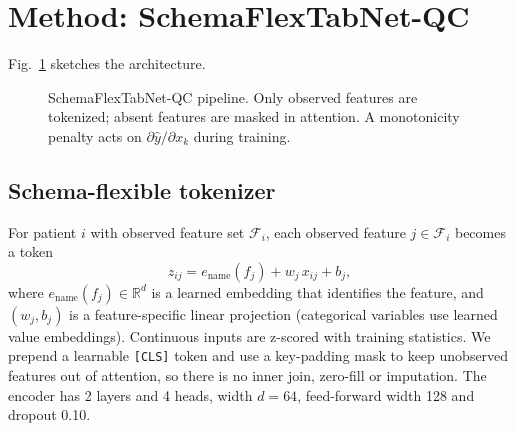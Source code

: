 \documentclass[conference]{IEEEtran}
\newcommand{\sfn}{SchemaFlexTabNet-QC}
\begin{document}
\section{Method: \sfn{}}\label{sec:method}
Fig.~\ref{fig:arch} sketches the architecture.

\begin{figure}[t]
\centering
{}
\caption{\sfn{} pipeline. Only observed features are tokenized; absent features are masked in attention. A monotonicity penalty acts on $\partial\hat y/\partial x_k$ during training.}
\label{fig:arch}
\end{figure}

\subsection{Schema-flexible tokenizer}
For patient $i$ with observed feature set $\mathcal{F}_i$, each observed feature $j\in\mathcal{F}_i$ becomes a token
\begin{equation}
z_{ij}=e_{\mathrm{name}}(f_j)+w_j\,x_{ij}+b_j,
\end{equation}
where $e_{\mathrm{name}}(f_j)\in\mathbb{R}^d$ is a learned embedding that identifies the feature, and $(w_j,b_j)$ is a feature-specific linear projection (categorical variables use learned value embeddings). Continuous inputs are z-scored with training statistics. We prepend a learnable \texttt{[CLS]} token and use a key-padding mask to keep unobserved features out of attention, so there is no inner join, zero-fill or imputation. The encoder has 2 layers and 4 heads, width $d=64$, feed-forward width 128 and dropout 0.10.
\end{document}
